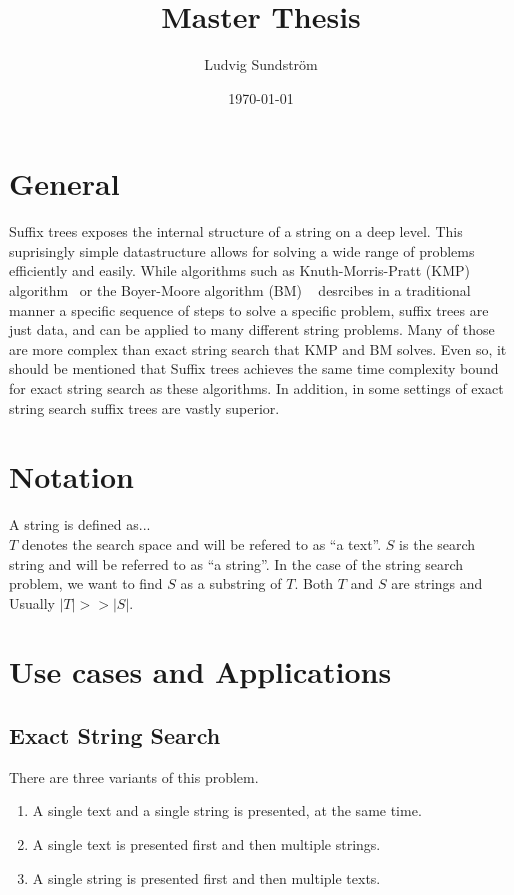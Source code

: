 \documentclass[a4paper]{article}
\title{Master Thesis}
\author{Ludvig Sundstr\"{o}m}
\date{\today}
\begin{document}
\maketitle

\section{General}

Suffix trees exposes the internal structure of a string on a deep level. This
suprisingly simple datastructure allows for solving a wide range of problems
efficiently and easily. While algorithms such as Knuth-Morris-Pratt (KMP)
algorithm~\cite{website:knp-wiki} or the Boyer-Moore algorithm (BM)
~\cite{website:bm-wiki} desrcibes in a traditional manner a specific sequence of
steps to solve a specific problem, suffix trees are just data, and can be
applied to many different string problems. Many of those are more complex than
exact string search that KMP and BM solves. Even so, it should be mentioned that
Suffix trees achieves the same time complexity bound for exact string search as
these algorithms. In addition, in some settings of exact string search suffix
trees are vastly superior.

\section{Notation}

A string is defined as...
\\
$T$ denotes the search space and will be refered to as ``a text''. $S$ is the
search string and will be referred to as ``a string''. In the case of the string
search problem, we want to find $S$ as a substring of $T$. Both $T$ and $S$ are
strings and Usually $|T| >> |S|$.

\section{Use cases and Applications}

\subsection{Exact String Search}

There are three variants of this problem.
\begin{enumerate}
        \item A single text and a single string is presented, at the same time.
        \item A single text is presented first and then multiple strings.
        \item A single string is presented first and then multiple texts.
\end{enumerate}
\end{document}
